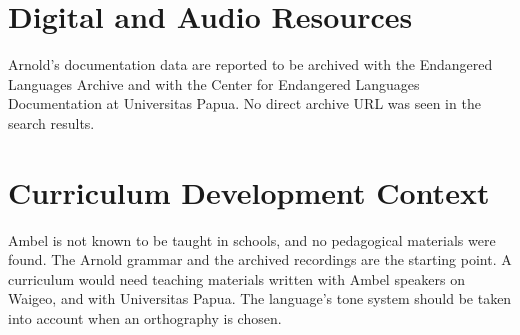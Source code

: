 \documentclass[12pt]{article}
\begin{document}
\section{Digital and Audio Resources}
Arnold's documentation data are reported to be archived with the Endangered Languages Archive and with the Center for Endangered Languages Documentation at Universitas Papua. No direct archive URL was seen in the search results.

\section{Curriculum Development Context}
Ambel is not known to be taught in schools, and no pedagogical materials were found. The Arnold grammar and the archived recordings are the starting point. A curriculum would need teaching materials written with Ambel speakers on Waigeo, and with Universitas Papua. The language's tone system should be taken into account when an orthography is chosen.
\end{document}
